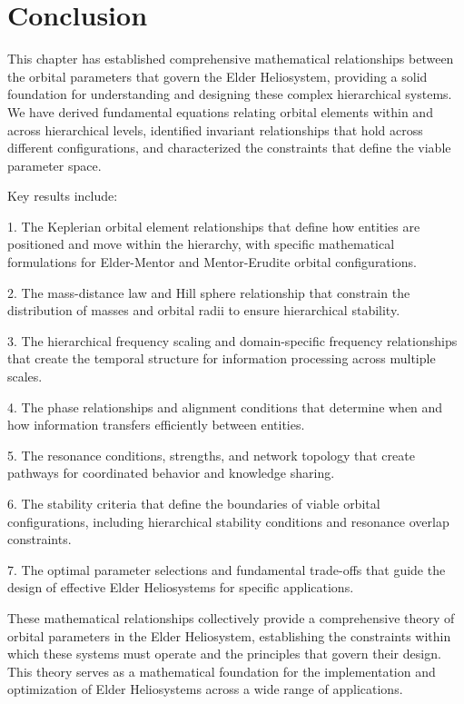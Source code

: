 \section{Conclusion}

This chapter has established comprehensive mathematical relationships between the orbital parameters that govern the Elder Heliosystem, providing a solid foundation for understanding and designing these complex hierarchical systems. We have derived fundamental equations relating orbital elements within and across hierarchical levels, identified invariant relationships that hold across different configurations, and characterized the constraints that define the viable parameter space.

Key results include:

1. The Keplerian orbital element relationships that define how entities are positioned and move within the hierarchy, with specific mathematical formulations for Elder-Mentor and Mentor-Erudite orbital configurations.

2. The mass-distance law and Hill sphere relationship that constrain the distribution of masses and orbital radii to ensure hierarchical stability.

3. The hierarchical frequency scaling and domain-specific frequency relationships that create the temporal structure for information processing across multiple scales.

4. The phase relationships and alignment conditions that determine when and how information transfers efficiently between entities.

5. The resonance conditions, strengths, and network topology that create pathways for coordinated behavior and knowledge sharing.

6. The stability criteria that define the boundaries of viable orbital configurations, including hierarchical stability conditions and resonance overlap constraints.

7. The optimal parameter selections and fundamental trade-offs that guide the design of effective Elder Heliosystems for specific applications.

These mathematical relationships collectively provide a comprehensive theory of orbital parameters in the Elder Heliosystem, establishing the constraints within which these systems must operate and the principles that govern their design. This theory serves as a mathematical foundation for the implementation and optimization of Elder Heliosystems across a wide range of applications.